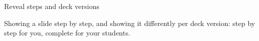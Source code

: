 
\begin{sectionframe}{Reveal steps and deck versions}
	\begin{minipage}[t]{0.9\linewidth}\small
		Showing a slide step by step, and showing it differently per deck version: step by step for you, complete for your students.
	\end{minipage}\par\medskip
	\SMChapterAgenda
\end{sectionframe}
